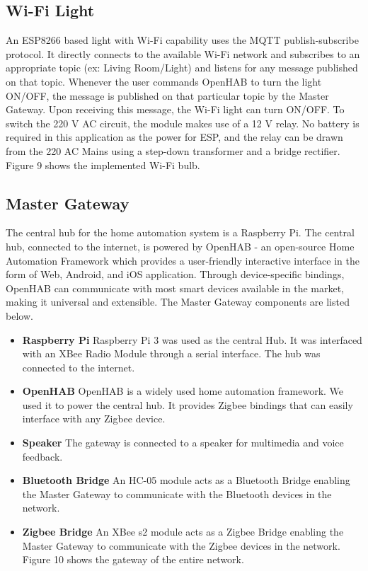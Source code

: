 \subsection{Wi-Fi Light}
An ESP8266 based light with Wi-Fi capability uses the MQTT publish-subscribe protocol. It directly connects to the available Wi-Fi network and subscribes to an appropriate topic (ex: Living Room/Light) and listens for any message published on that topic. Whenever the user commands OpenHAB to turn the light ON/OFF, the message is published on that particular topic by the Master Gateway. Upon receiving this message, the Wi-Fi light can turn ON/OFF. To switch the 220 V AC circuit, the module makes use of a 12 V relay. No battery is required in this application as the power for ESP, and the relay can be drawn from the 220 AC Mains using a step-down transformer and a bridge rectifier. Figure 9 shows the implemented Wi-Fi bulb.


\subsection{Master Gateway}
The central hub for the home automation system is a Raspberry Pi. The central hub, connected to the internet, is powered by OpenHAB - an open-source Home Automation Framework which provides a user-friendly interactive interface in the form of Web, Android, and iOS application. Through device-specific bindings, OpenHAB can communicate with most smart devices available in the market, making it universal and extensible. The Master Gateway components are listed below.

\begin{itemize}
\item \textbf{Raspberry Pi}
Raspberry Pi 3 was used as the central Hub. It was interfaced with an XBee Radio Module through a serial interface. The hub was connected to the internet. 
\item \textbf{OpenHAB}
OpenHAB is a widely used home automation framework. We used it to power the central hub. It provides Zigbee bindings that can easily interface with any Zigbee device. 
\item \textbf{Speaker}
The gateway is connected to a speaker for multimedia and voice feedback. 
\item \textbf{Bluetooth Bridge}
An HC-05 module acts as a Bluetooth Bridge enabling the Master Gateway to communicate with the Bluetooth devices in the network. 
\item \textbf{Zigbee Bridge}
An XBee s2 module acts as a Zigbee Bridge enabling the Master Gateway to communicate with the Zigbee devices in the network. Figure 10 shows the gateway of the entire network.
\end{itemize}

